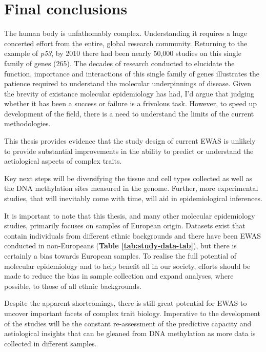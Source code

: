 \documentclass[11pt,oneside]{bristolthesis}
\begin{document}
\hypertarget{final-conclusions}{%
\section{Final conclusions}\label{final-conclusions}}

The human body is unfathomably complex. Understanding it requires a huge concerted effort from the entire, global research community. Returning to the example of \emph{p53}, by 2010 there had been nearly 50,000 studies on this single family of genes (265). The decades of research conducted to elucidate the function, importance and interactions of this single family of genes illustrates the patience required to understand the molecular underpinnings of disease. Given the brevity of existance molecular epidemiology has had, I'd argue that judging whether it has been a success or failure is a frivolous task. However, to speed up development of the field, there is a need to understand the limits of the current methodologies.

This thesis provides evidence that the study design of current EWAS is unlikely to provide substantial improvements in the ability to predict or understand the aetiological aspects of complex traits.

Key next steps will be diversifying the tissue and cell types collected as well as the DNA methylation sites measured in the genome. Further, more experimental studies, that will inevitably come with time, will aid in epidemiological inferences.

It is important to note that this thesis, and many other molecular epidemiology studies, primarily focuses on samples of European origin. Datasets exist that contain individuals from different ethnic backgrounds and there have been EWAS conducted in non-Europeans (\textbf{Table \ref{tab:study-data-tab}}), but there is certainly a bias towards European samples. To realise the full potential of molecular epidemiology and to help benefit all in our society, efforts should be made to reduce the bias in sample collection and expand analyses, where possible, to those of all ethnic backgrounds.

Despite the apparent shortcomings, there is still great potential for EWAS to uncover important facets of complex trait biology. Imperative to the development of the studies will be the constant re-assessment of the predictive capacity and aetiological insights that can be gleaned from DNA methylation as more data is collected in different samples.
\end{document}

